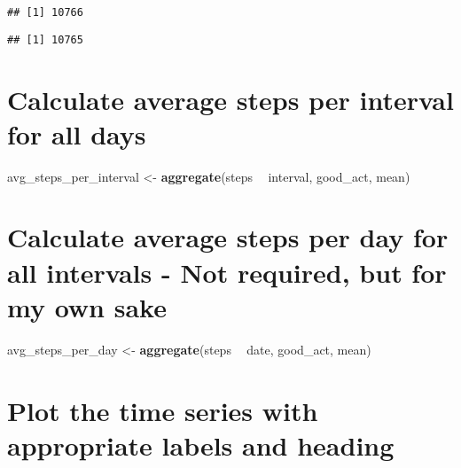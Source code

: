 \documentclass[
]{article}
\newenvironment{Shaded}{\begin{snugshade}}{\end{snugshade}}
\newcommand{\KeywordTok}[1]{\textcolor[rgb]{0.13,0.29,0.53}{\textbf{#1}}}
\newcommand{\NormalTok}[1]{#1}
\newcommand{\OperatorTok}[1]{\textcolor[rgb]{0.81,0.36,0.00}{\textbf{#1}}}
\newcommand{\StringTok}[1]{\textcolor[rgb]{0.31,0.60,0.02}{#1}}
\begin{document}
\begin{verbatim}
## [1] 10766
\end{verbatim}

\begin{Shaded}
\end{Shaded}

\begin{verbatim}
## [1] 10765
\end{verbatim}

\hypertarget{calculate-average-steps-per-interval-for-all-days}{%
\section{Calculate average steps per interval for all
days}\label{calculate-average-steps-per-interval-for-all-days}}

\begin{Shaded}
\begin{Highlighting}[]
\NormalTok{avg_steps_per_interval <-}\StringTok{ }\KeywordTok{aggregate}\NormalTok{(steps }\OperatorTok{~}\StringTok{ }\NormalTok{interval, good_act, mean)}
\end{Highlighting}
\end{Shaded}

\hypertarget{calculate-average-steps-per-day-for-all-intervals---not-required-but-for-my-own-sake}{%
\section{Calculate average steps per day for all intervals - Not
required, but for my own
sake}\label{calculate-average-steps-per-day-for-all-intervals---not-required-but-for-my-own-sake}}

\begin{Shaded}
\begin{Highlighting}[]
\NormalTok{avg_steps_per_day <-}\StringTok{ }\KeywordTok{aggregate}\NormalTok{(steps }\OperatorTok{~}\StringTok{ }\NormalTok{date, good_act, mean)}
\end{Highlighting}
\end{Shaded}

\hypertarget{plot-the-time-series-with-appropriate-labels-and-heading}{%
\section{Plot the time series with appropriate labels and
heading}\label{plot-the-time-series-with-appropriate-labels-and-heading}}
\end{document}
